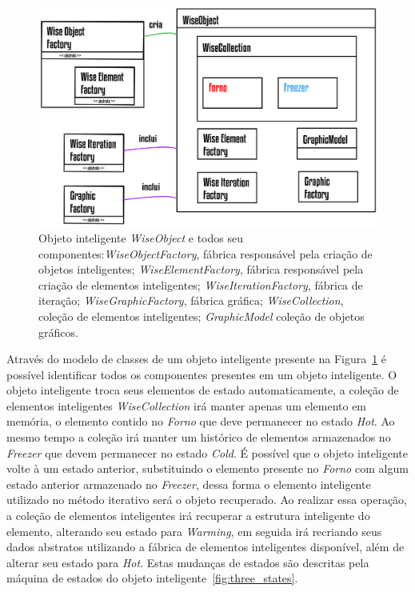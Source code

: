 \begin{figure}[!htbp]
	\centering
	\includegraphics[scale=1.15]{Figures/WiseObject@16x.png}
	\caption{Objeto inteligente \textit{WiseObject} e todos seu componentes:\textit{WiseObjectFactory}, fábrica responsável pela criação de objetos inteligentes; \textit{WiseElementFactory}, fábrica responsável pela criação de elementos inteligentes; \textit{WiseIterationFactory}, fábrica de iteração; \textit{WiseGraphicFactory}, fábrica gráfica; \textit{WiseCollection}, coleção de elementos inteligentes; \textit{GraphicModel} coleção de objetos gráficos.}
	\label{fig7:wiseobject}
\end{figure}

Através do modelo de classes de um objeto inteligente presente na Figura~\ref{fig7:wiseobject} é possível identificar todos os componentes presentes em um objeto inteligente. O objeto inteligente troca seus elementos de estado automaticamente, a coleção de elementos inteligentes \textit{WiseCollection} irá manter apenas um elemento em memória, o elemento contido no \textit{Forno} que deve permanecer no estado \textit{Hot}. Ao mesmo tempo a coleção irá manter um histórico de elementos armazenados no \textit{Freezer} que devem permanecer no estado \textit{Cold}. É possível que o objeto inteligente volte à um estado anterior, substituindo o elemento presente no \textit{Forno} com algum estado anterior armazenado no \textit{Freezer}, dessa forma o elemento inteligente utilizado no método iterativo será o objeto recuperado. Ao realizar essa operação, a coleção de elementos inteligentes irá recuperar a estrutura inteligente do elemento, alterando seu estado para \textit{Warming}, em seguida irá recriando seus dados abstratos utilizando a fábrica de elementos inteligentes disponível, além de alterar seu estado para \textit{Hot}. Estas mudanças de estados são descritas pela máquina de estados do objeto inteligente~\ref{fig:three_states}.

